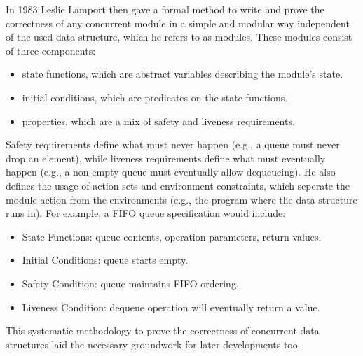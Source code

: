 In 1983 Leslie Lamport then gave a formal method to write and prove the correctness of any concurrent module in a simple and modular way independent of the used data structure, which he refers to as modules. These modules consist of three components: 
\begin{itemize}
   \item state functions, which are abstract variables describing the module's state.
   \item initial conditions, which are predicates on the state functions.
   \item properties, which are a mix of safety and liveness requirements.
\end{itemize}
Safety requirements define what must never happen (e.g., a queue must never drop an element), while liveness requirements define what must eventually happen (e.g., a non-empty queue must eventually allow dequeueing). He also defines the usage of action sets and environment constraints, which seperate the module action from the environments (e.g., the program where the data structure runs in). For example, a \ac{FIFO} queue specification would include:
\begin{itemize}
   \item State Functions: queue contents, operation parameters, return values.
   \item Initial Conditions: queue starts empty.
   \item Safety Condition: queue maintains \ac{FIFO} ordering.
   \item Liveness Condition: dequeue operation will eventually return a value.
\end{itemize}
This systematic methodology to prove the correctness of concurrent data structures laid the necessary groundwork for later developments too. \cite{Lamport1983SPSCCircularBuffer}

